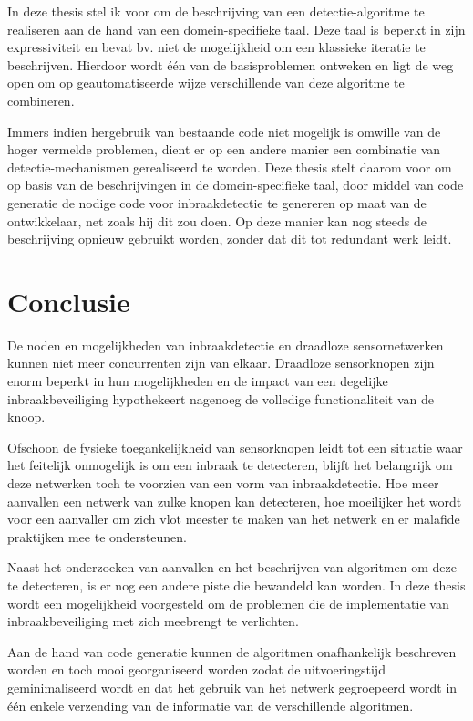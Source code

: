 \documentclass[12pt,a4paper]{article}
\begin{document}
In deze thesis stel ik voor om de beschrijving van een detectie-algoritme te
realiseren aan de hand van een domein-specifieke taal. Deze taal is beperkt in
zijn expressiviteit en bevat bv. niet de mogelijkheid om een klassieke iteratie
te beschrijven. Hierdoor wordt \'e\'en van de basisproblemen ontweken en ligt
de weg open om op geautomatiseerde wijze verschillende van deze algoritme te
combineren.

Immers indien hergebruik van bestaande code niet mogelijk is omwille van de
hoger vermelde problemen, dient er op een andere manier een combinatie van
detectie-mechanismen gerealiseerd te worden. Deze thesis stelt daarom voor om
op basis van de beschrijvingen in de domein-specifieke taal, door middel van
code generatie de nodige code voor inbraakdetectie te genereren op maat van de
ontwikkelaar, net zoals hij dit zou doen. Op deze manier kan nog steeds de
beschrijving opnieuw gebruikt worden, zonder dat dit tot redundant werk leidt.

\section*{Conclusie}

De noden en mogelijkheden van inbraakdetectie en draadloze sensornetwerken
kunnen niet meer concurrenten zijn van elkaar. Draadloze sensorknopen zijn
enorm beperkt in hun mogelijkheden en de impact van een degelijke
inbraakbeveiliging hypothekeert nagenoeg de volledige functionaliteit van de
knoop.

Ofschoon de fysieke toegankelijkheid van sensorknopen leidt tot een situatie
waar het feitelijk onmogelijk is om een inbraak te detecteren, blijft het
belangrijk om deze netwerken toch te voorzien van een vorm van inbraakdetectie.
Hoe meer aanvallen een netwerk van zulke knopen kan detecteren, hoe moeilijker
het wordt voor een aanvaller om zich vlot meester te maken van het netwerk en
er malafide praktijken mee te ondersteunen.

Naast het onderzoeken van aanvallen en het beschrijven van algoritmen om deze
te detecteren, is er nog een andere piste die bewandeld kan worden. In deze
thesis wordt een mogelijkheid voorgesteld om de problemen die de implementatie
van inbraakbeveiliging met zich meebrengt te verlichten.

Aan de hand van code generatie kunnen de algoritmen onafhankelijk beschreven
worden en toch mooi georganiseerd worden zodat de uitvoeringstijd
geminimaliseerd wordt en dat het gebruik van het netwerk gegroepeerd wordt in
\'e\'en enkele verzending van de informatie van de verschillende algoritmen.
\end{document}
